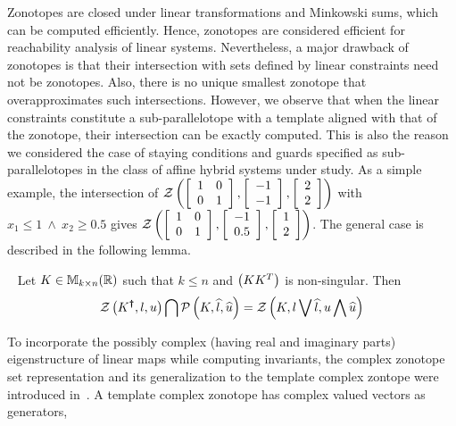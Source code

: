 Zonotopes are closed under linear transformations and Minkowski sums, which can be computed efficiently.  Hence, zonotopes are
considered efficient for reachability analysis of linear systems.  Nevertheless,
a major drawback of zonotopes is that their intersection with sets defined by linear
constraints need not be zonotopes.  Also, there is no unique smallest
zonotope that overapproximates such intersections.  However, we observe that when the linear constraints
constitute a sub-parallelotope with a template aligned with that of
the zonotope, their intersection can be exactly computed.  This is
also the reason we considered the case of staying conditions and guards specified as sub-parallelotopes 
in the class of affine hybrid systems under study.  As a simple example, the intersection of
$\mathcal{Z}\left(\left[\begin{array}{l l}1 & 0 \\ 0 &
      1\end{array}\right],\left[\begin{array}{c}-1\\ -1\end{array}\right],\left[\begin{array}{c}2\\ 2\end{array}\right]\right)$
with $x_1\leq 1~\wedge~x_2\geq 0.5$ gives $\mathcal{Z}\left(\left[\begin{array}{l
        l}1 & 0 \\ 0 &
      1\end{array}\right],\left[\begin{array}{c}-1\\ 0.5\end{array}\right],\left[\begin{array}{c}1\\ 2\end{array}\right]\right)$.
The general case is described in the following lemma.
%
\begin{lemma}~\label{lem:motivation}
Let $K\in\mathbb{M}_{k\times n}(\mathbb{R})$ such that $k\leq n$ and $\left(KK^T\right)$ is
non-singular.  Then
\[
\mathcal{Z}\left(K^{\bm{\dagger}},l,u\right) \bigcap \mathcal{P}\left(K,\widehat{l},\widehat{u}\right)
= \mathcal{Z}\left(K,l\bigvee \widehat{l},u\bigwedge \widehat{u}\right)
\]
\end{lemma}
%
To incorporate the possibly complex (having real and imaginary parts)
eigenstructure of linear maps while computing invariants, the complex
zonotope set representation and its generalization to the template
complex zontope were introduced in~\cite{adimoolam2016using,tcz2017}.
A template complex zonotope has complex valued vectors as generators,
